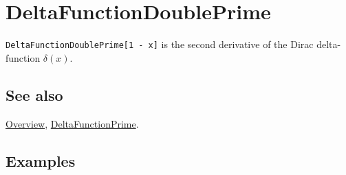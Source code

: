 \documentclass[../FeynCalcManual.tex]{subfiles}
\begin{document}
\hypertarget{deltafunctiondoubleprime}{%
\section{DeltaFunctionDoublePrime}\label{deltafunctiondoubleprime}}

\texttt{DeltaFunctionDoublePrime[\allowbreak{}1 - x]} is the second
derivative of the Dirac delta-function \(\delta (x)\).

\subsection{See also}

\hyperlink{toc}{Overview},
\hyperlink{deltafunctionprime}{DeltaFunctionPrime}.

\subsection{Examples}
\end{document}
